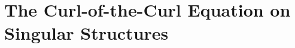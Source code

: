 \chapter{The Curl-of-the-Curl Equation on Singular Structures} \label{ch:CurlCurl}











\begin{subappendices}



\end{subappendices}
